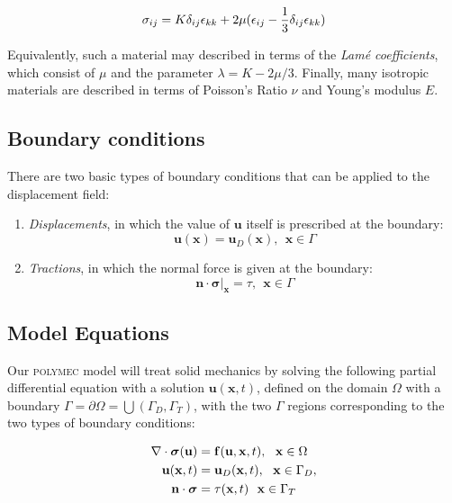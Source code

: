 \documentclass[12pt]{article}
\newcommand{\labelEq}[1]{\label{eq:#1}}
\newcommand{\polymec}{\textsc{polymec} }
\newcommand{\Lame}{Lam\'e }
\renewcommand{\vec}[1]{\mathbf{#1}}
\newcommand{\diverg}[1]{\nabla\cdot#1}
\newcommand{\third}{\small\frac{1}{3}}
\newcommand{\stress}{\boldsymbol\sigma}
\begin{document}
\begin{equation}
\sigma_{ij} = K \delta_{ij}\epsilon_{kk} + 2\mu(\epsilon_{ij} - \third\delta_{ij}\epsilon_{kk})
\end{equation}

\noindent
Equivalently, such a material may described in terms of the {\em \Lame coefficients}, which 
consist of $\mu$ and the parameter $\lambda = K - 2\mu/3$. Finally, many isotropic materials are 
described in terms of Poisson's Ratio $\nu$ and Young's modulus $E$.

\subsection*{Boundary conditions}

There are two basic types of boundary conditions that can be applied to the 
displacement field:

\begin{enumerate}
 \item {\em Displacements}, in which the value of $\vec{u}$ itself is prescribed at the boundary:
 \begin{equation}
 \vec{u}(\vec{x}) = \vec{u}_D(\vec{x}), ~~\vec{x} \in \Gamma \labelEq{displacementBC}
 \end{equation}
 \item {\em Tractions}, in which the normal force is given at the boundary:
 \begin{equation}
 \vec{n}\cdot\stress\big|_\vec{x} = \tau, ~~\vec{x} \in \Gamma \labelEq{tractionBC}
 \end{equation}
 \noindent
\end{enumerate}

\subsection*{Model Equations}

Our \polymec model will treat solid mechanics by solving the following partial differential equation 
with a solution $\vec{u}(\vec{x}, t)$, defined on the domain $\Omega$ with a boundary 
$\Gamma = \partial\Omega = \bigcup(\Gamma_D, \Gamma_T)$, with the two $\Gamma$ regions 
corresponding to the two types of boundary conditions:

\begin{align}
\diverg\stress(\vec{u}) &= \vec{f}(\vec{u}, \vec{x}, t), ~~\vec{x} \in \Omega \labelEq{modelEq} \\
\vec{u}(\vec{x}, t) &= \vec{u}_D(\vec{x}, t), ~~\vec{x} \in \Gamma_D, \notag \\
\vec{n}\cdot\stress &= \tau(\vec{x}, t) ~~\vec{x} \in \Gamma_T \notag
\end{align}
\end{document}
